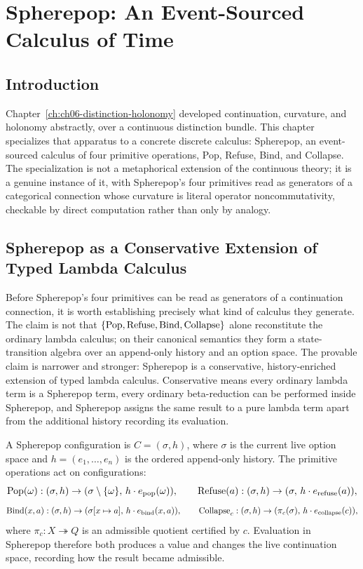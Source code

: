 
\chapter{Spherepop: An Event-Sourced Calculus of Time}
\label{ch:ch07-spherepop}
\section{Introduction}

Chapter~\ref{ch:ch06-distinction-holonomy} developed continuation, curvature, and holonomy abstractly, over a continuous distinction bundle. This chapter specializes that apparatus to a concrete discrete calculus: Spherepop, an event-sourced calculus of four primitive operations, Pop, Refuse, Bind, and Collapse. The specialization is not a metaphorical extension of the continuous theory; it is a genuine instance of it, with Spherepop's four primitives read as generators of a categorical connection whose curvature is literal operator noncommutativity, checkable by direct computation rather than only by analogy.

\section{Spherepop as a Conservative Extension of Typed Lambda Calculus}

Before Spherepop's four primitives can be read as generators of a continuation connection, it is worth establishing precisely what kind of calculus they generate. The claim is not that $\{\mathrm{Pop}, \mathrm{Refuse}, \mathrm{Bind}, \mathrm{Collapse}\}$ alone reconstitute the ordinary lambda calculus; on their canonical semantics they form a state-transition algebra over an append-only history and an option space. The provable claim is narrower and stronger: Spherepop is a conservative, history-enriched extension of typed lambda calculus. Conservative means every ordinary lambda term is a Spherepop term, every ordinary beta-reduction can be performed inside Spherepop, and Spherepop assigns the same result to a pure lambda term apart from the additional history recording its evaluation.

A Spherepop configuration is $C = (\sigma, h)$, where $\sigma$ is the current live option space and $h = (e_1, \ldots, e_n)$ is the ordered append-only history. The primitive operations act on configurations:
\[
\mathrm{Pop}(\omega) : (\sigma,h) \to (\sigma \setminus \{\omega\},\, h \cdot e_{\mathrm{pop}}(\omega)), \qquad
\mathrm{Refuse}(a) : (\sigma,h) \to (\sigma,\, h \cdot e_{\mathrm{refuse}}(a)),
\]
\[
\mathrm{Bind}(x,a) : (\sigma,h) \to (\sigma[x \mapsto a],\, h \cdot e_{\mathrm{bind}}(x,a)), \qquad
\mathrm{Collapse}_c : (\sigma,h) \to (\pi_c(\sigma),\, h \cdot e_{\mathrm{collapse}}(c)),
\]
where $\pi_c : X \twoheadrightarrow Q$ is an admissible quotient certified by $c$. Evaluation in Spherepop therefore both produces a value and changes the live continuation space, recording how the result became admissible.

